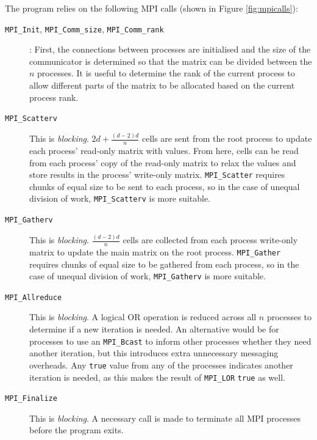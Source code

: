 \documentclass[11pt]{article}
\begin{document}
\begin{minipage}[t]{0.55\textwidth}
The program relies on the following MPI calls (shown in Figure \ref{fig:mpicalls}):
\begin{description}
\item[\texttt{MPI\_Init}, \texttt{MPI\_Comm\_size}, \texttt{MPI\_Comm\_rank}]: First, the connections between processes are initialised and the size of the communicator is determined so that the matrix can be divided between the $n$ processes. It is useful to determine the rank of the current process to allow different parts of the matrix to be allocated based on the current process rank.
\item[\texttt{MPI\_Scatterv}] This is \textit{blocking}. $2d+ \frac{(d-2)d}{n}$ cells are sent from the root process to update each process' read-only matrix with values. From here, cells can be read from each process' copy of the read-only matrix to relax the values and store results in the process' write-only matrix. \texttt{MPI\_Scatter} requires chunks of equal size to be sent to each process, so in the case of unequal division of work, \texttt{MPI\_Scatterv} is more suitable.
\item[\texttt{MPI\_Gatherv}] This is \textit{blocking}. $\frac{(d-2)d}{n}$ cells are collected from each process write-only matrix to update the main matrix on the root process. \texttt{MPI\_Gather} requires chunks of equal size to be gathered from each process, so in the case of unequal division of work, \texttt{MPI\_Gatherv} is more suitable.
\item[\texttt{MPI\_Allreduce}] This is \textit{blocking}. A logical OR operation is reduced across all $n$ processes to determine if a new iteration is needed. An alternative would be for processes to use an \texttt{MPI\_Bcast} to inform other processes whether they need another iteration, but this introduces extra unnecessary messaging overheads. Any \texttt{true} value from any of the processes indicates another iteration is needed, as this makes the result of \texttt{MPI\_LOR} \texttt{true} as well.
\item[\texttt{MPI\_Finalize}] This is \textit{blocking}. A necessary call is made to terminate all MPI processes before the program exits.
\end{description}
\end{minipage}
\end{document}
